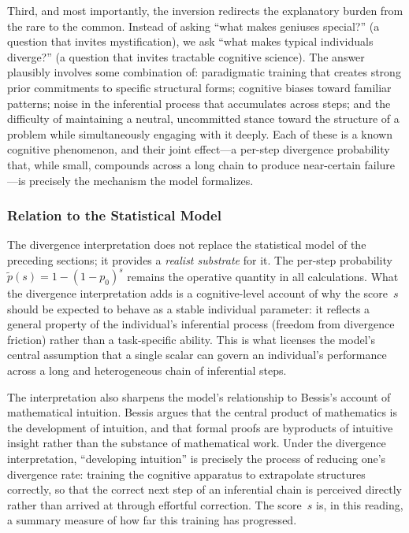 \documentclass{article}
\begin{document}
Third, and most importantly, the inversion redirects the explanatory burden from the rare to the common. Instead of asking ``what makes geniuses special?'' (a question that invites mystification), we ask ``what makes typical individuals diverge?'' (a question that invites tractable cognitive science). The answer plausibly involves some combination of: paradigmatic training that creates strong prior commitments to specific structural forms; cognitive biases toward familiar patterns; noise in the inferential process that accumulates across steps; and the difficulty of maintaining a neutral, uncommitted stance toward the structure of a problem while simultaneously engaging with it deeply. Each of these is a known cognitive phenomenon, and their joint effect---a per-step divergence probability that, while small, compounds across a long chain to produce near-certain failure---is precisely the mechanism the model formalizes.

\subsubsection{Relation to the Statistical Model}

The divergence interpretation does not replace the statistical model of the preceding sections; it provides a \emph{realist substrate} for it. The per-step probability $\widetilde{p}(s) = 1 - (1-p_0)^s$ remains the operative quantity in all calculations. What the divergence interpretation adds is a cognitive-level account of why the score~$s$ should be expected to behave as a stable individual parameter: it reflects a general property of the individual's inferential process (freedom from divergence friction) rather than a task-specific ability. This is what licenses the model's central assumption that a single scalar can govern an individual's performance across a long and heterogeneous chain of inferential steps.

The interpretation also sharpens the model's relationship to Bessis's \cite{bessis2024mathematica, bessis2025genes, bessis2026jaimungal} account of mathematical intuition. Bessis argues that the central product of mathematics is the development of intuition, and that formal proofs are byproducts of intuitive insight rather than the substance of mathematical work. Under the divergence interpretation, ``developing intuition'' is precisely the process of reducing one's divergence rate: training the cognitive apparatus to extrapolate structures correctly, so that the correct next step of an inferential chain is perceived directly rather than arrived at through effortful correction. The score~$s$ is, in this reading, a summary measure of how far this training has progressed.
\end{document}
